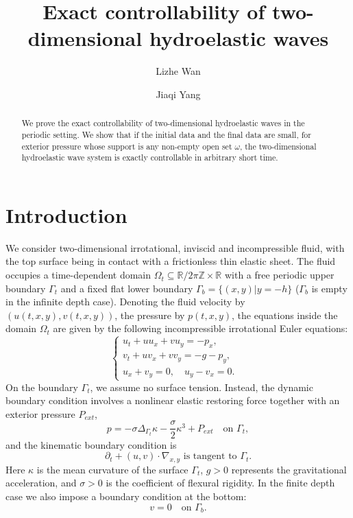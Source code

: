 \documentclass[12pt]{amsart}
\author{Lizhe Wan}
\author{Jiaqi Yang}
\theoremstyle{remark}
\theoremstyle{definition}
\numberwithin{equation}{section}
\newcommand{\f}{\frac}
\begin{document}
\title{Exact controllability of two-dimensional hydroelastic waves}

\begin{abstract}
We prove the exact controllability of two-dimensional hydroelastic waves in the periodic setting.
We show that if the initial data and the final data are small, for exterior pressure  whose support is any non-empty open set $\omega$, the two-dimensional hydroelastic wave system is exactly controllable in arbitrary short time. 
\end{abstract}

\maketitle
    
	

\section{Introduction} \label{s:Intro}
We consider two-dimensional irrotational, inviscid and incompressible fluid, with the top surface being in contact with a frictionless thin elastic sheet.
The fluid occupies a time-dependent domain $\Omega_t \subseteq \mathbb{R}/2\pi \mathbb{Z} \times \mathbb{R}$ with a free periodic upper boundary $\Gamma_t$ and a fixed flat lower boundary $\Gamma_b = \{(x,y)|y= -h\}$ ($\Gamma_b$ is empty in the infinite depth case).
Denoting the fluid velocity by $(u(t,x,y), v(t,x,y))$, the pressure by $p(t,x,y)$, the equations inside the domain $\Omega_t$ are given by the following incompressible irrotational Euler equations:
\begin{equation*}
\left\{
             \begin{array}{lr}
            u_t +uu_x +vu_y = -p_x,&  \\
            v_t + uv_x +vv_y = -g-p_y,& \\
            u_x +v_y =0, \quad u_y -v_x = 0.&
             \end{array}
\right.
\end{equation*}
On the boundary $\Gamma_t$, we assume no surface tension. 
Instead, the dynamic boundary condition involves a nonlinear elastic restoring force together with an exterior pressure $P_{ext}$,
\begin{equation*}
    p = - \sigma\Delta_{\Gamma_t} \kappa -\f{\sigma}{2} \kappa^3+ P_{ext} \quad \text{on }\Gamma_t,
\end{equation*}
and the kinematic boundary condition is
\begin{equation*}
    \partial_t +(u,v)\cdot \nabla_{x,y} \text{ is tangent to }\Gamma_t.
\end{equation*}
Here $\kappa$ is the mean curvature of the surface $\Gamma_t$, $g> 0$ represents the gravitational acceleration, and $\sigma>0$ is the coefficient of flexural rigidity. 
In the finite depth case we also impose a boundary condition at the bottom:
\begin{equation*}
    v = 0 \quad \text{on } \Gamma_b.
\end{equation*}
\end{document}

